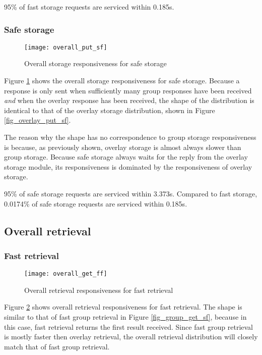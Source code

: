 95\% of fast storage requests are serviced within 0.185s.

\subsubsection{Safe storage}
\begin{figure}[htbp]
 \centering
 \texttt{[image: overall\_put\_sf]}
 \caption{Overall storage responsiveness for safe storage}
 \label{fig_overall_put_sf}
\end{figure}
%
Figure \ref{fig_overall_put_sf} shows the overall storage responsiveness for safe storage. Because a response is only sent when sufficiently many group responses have been received \emph{and} when the overlay response has been received, the shape of the distribution is identical to that of the overlay storage distribution, shown in Figure \ref{fig_overlay_put_sf}.

The reason why the shape has no correspondence to group storage responsiveness is because, as previously shown, overlay storage is almost always slower than group storage. Because safe storage always waits for the reply from the overlay storage module, its responsiveness is dominated by the responsiveness of overlay storage.

95\% of safe storage requests are serviced within 3.373s. Compared to fast storage, 0.0174\% of safe storage requests are serviced within 0.185s.

\subsection{Overall retrieval}
\subsubsection{Fast retrieval}
\begin{figure}[htbp]
 \centering
 \texttt{[image: overall\_get\_ff]}
 \caption{Overall retrieval responsiveness for fast retrieval}
 \label{fig_overall_get_ff}
\end{figure}
%
Figure \ref{fig_overall_get_ff} shows overall retrieval responsiveness for fast retrieval. The shape is similar to that of fast group retrieval in Figure \ref{fig_group_get_sf}, because in this case, fast retrieval returns the first result received. Since fast group retrieval is mostly faster then overlay retrieval, the overall retrieval distribution will closely match that of fast group retrieval.

